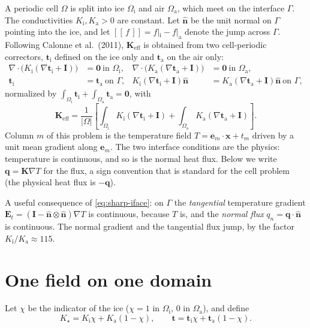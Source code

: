\documentclass[11pt]{article}
\newcommand{\Om}{\Omega}
\newcommand{\Gam}{\Gamma}
\newcommand{\bn}{\hat{\mathbf n}}
\newcommand{\bI}{\mathbf I}
\newcommand{\be}{\mathbf e}
\newcommand{\bt}{\mathbf t}
\newcommand{\bK}{\mathbf K}
\newcommand{\Keff}{\mathbf{K}_{\mathrm{eff}}}
\newcommand{\Ka}{K_{\mathrm a}}
\newcommand{\Ki}{K_{\mathrm i}}
\newcommand{\jump}[1]{[\![\,#1\,]\!]}
\begin{document}
A periodic cell $\Om$ is split into ice $\Om_{\mathrm i}$ and air
$\Om_{\mathrm a}$, which meet on the interface $\Gam$. The conductivities
$\Ki,\Ka>0$ are constant. Let $\bn$ be the unit normal on $\Gam$ pointing into
the ice, and let $\jump{f}=f|_{\mathrm i}-f|_{\mathrm a}$ denote the jump across
$\Gam$. Following Calonne et al.\ (2011), $\Keff$ is obtained from two
cell-periodic correctors, $\bt_{\mathrm i}$ defined on the ice only and
$\bt_{\mathrm a}$ on the air only:
\begin{align}
\nabla\!\cdot\!\big(\Ki(\nabla\bt_{\mathrm i}+\bI)\big)&=\mathbf 0\ \text{in }\Om_{\mathrm i},&
\nabla\!\cdot\!\big(\Ka(\nabla\bt_{\mathrm a}+\bI)\big)&=\mathbf 0\ \text{in }\Om_{\mathrm a},
\label{eq:sharp-bulk}\\
\bt_{\mathrm i}&=\bt_{\mathrm a}\ \text{on }\Gam,&
\Ki(\nabla\bt_{\mathrm i}+\bI)\bn&=\Ka(\nabla\bt_{\mathrm a}+\bI)\bn\ \text{on }\Gam,
\label{eq:sharp-iface}
\end{align}
normalized by
$\int_{\Om_{\mathrm i}}\bt_{\mathrm i}+\int_{\Om_{\mathrm a}}\bt_{\mathrm a}=\mathbf 0$,
with
\begin{equation}
\Keff=\frac{1}{|\Om|}\left[\int_{\Om_{\mathrm i}}\Ki(\nabla\bt_{\mathrm i}+\bI)
+\int_{\Om_{\mathrm a}}\Ka(\nabla\bt_{\mathrm a}+\bI)\right].
\label{eq:sharp-keff}
\end{equation}
Column $m$ of this problem is the temperature field $T=\be_m\cdot\mathbf x+t_m$
driven by a unit mean gradient along $\be_m$. The two interface conditions are
the physics: temperature is continuous, and so is the normal heat flux. Below we
write $\mathbf q=\bK\nabla T$ for the flux, a sign convention that is standard
for the cell problem (the physical heat flux is $-\mathbf q$).

A useful consequence of \eqref{eq:sharp-iface}: on $\Gam$ the
\emph{tangential} temperature gradient $\mathbf E_t=(\bI-\bn\otimes\bn)\nabla T$
is continuous, because $T$ is, and the \emph{normal flux}
$q_n=\mathbf q\cdot\bn$ is continuous. The normal gradient and the tangential
flux jump, by the factor $\Ki/\Ka\approx115$.

\section{One field on one domain}
\label{sec:glue}

Let $\chi$ be the indicator of the ice ($\chi=1$ in $\Om_{\mathrm i}$, $0$ in
$\Om_{\mathrm a}$), and define
\begin{equation}
K_\star=\Ki\chi+\Ka(1-\chi),\qquad \bt=\bt_{\mathrm i}\chi+\bt_{\mathrm a}(1-\chi).
\label{eq:glue}
\end{equation}
\end{document}

